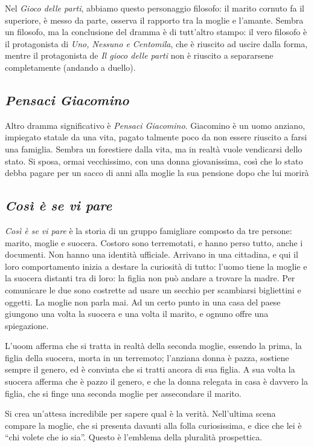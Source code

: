 Nel \textit{Gioco delle parti}, abbiamo questo personaggio filosofo: il marito cornuto fa il superiore, è messo da parte, osserva il rapporto tra la moglie e l’amante.
Sembra un filosofo, ma la conclusione del dramma è di tutt’altro stampo: il vero filosofo è il protagonista di \textit{Uno, Nessuno e Centomila}, che è riuscito ad uscire dalla forma, mentre il protagonista de \textit{Il gioco delle parti} non è riuscito a separarsene completamente (andando a duello).

\subsection{\textit{Pensaci Giacomino}}

Altro dramma significativo è \textit{Pensaci Giacomino}. 
Giacomino è un uomo anziano, impiegato statale da una vita, pagato talmente poco da non essere riuscito a farsi una famiglia.
Sembra un forestiere dalla vita, ma in realtà vuole vendicarsi dello stato.
Si sposa, ormai vecchissimo, con una donna giovanissima, così che lo stato debba pagare per un sacco di anni alla moglie la sua pensione dopo che lui morirà

\subsection{\textit{Così è se vi pare}}

\textit{Così è se vi pare} è la storia di un gruppo famigliare composto da tre persone: marito, moglie e suocera. Costoro sono terremotati, e hanno perso tutto, anche i documenti. Non hanno una identità ufficiale.
Arrivano in una cittadina, e qui il loro comportamento inizia a destare la curiosità di tutto: l’uomo tiene la moglie e la suocera distanti tra di loro: la figlia non può andare a trovare la madre.
Per comunicare le due sono costrette ad usare un secchio per scambiarsi bigliettini e oggetti.
La moglie non parla mai.
Ad un certo punto in una casa del paese giungono una volta la suocera e una volta il marito, e ognuno offre una spiegazione. 

L'uoom afferma che si tratta in realtà della seconda moglie, essendo la prima, la figlia della suocera, morta in un terremoto; l'anziana donna è pazza, sostiene sempre il genero, ed è convinta che si tratti ancora di sua figlia.
A sua volta la suocera afferma che è pazzo il genero, e che la donna relegata in casa è davvero la figlia, che si finge una seconda moglie per assecondare il marito.

Si crea un’attesa incredibile per sapere qual è la verità. Nell’ultima scena compare la moglie, che si presenta davanti alla folla curiosissima, e dice che lei è “chi volete che io sia”.
Questo è l’emblema della pluralità prospettica.

